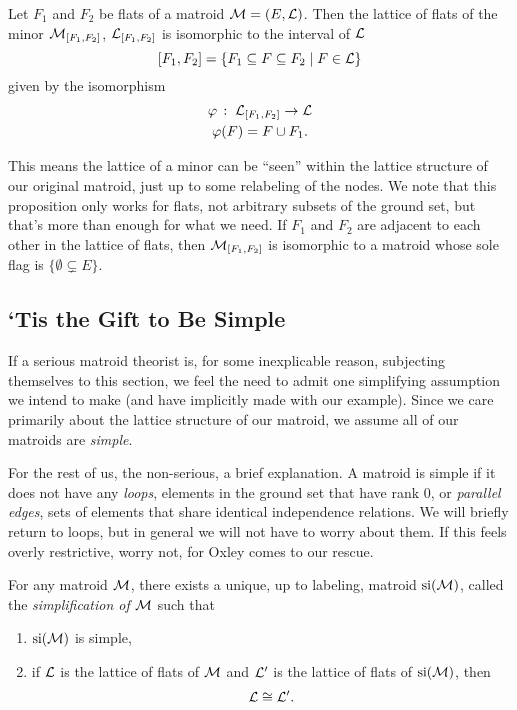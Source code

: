 \documentclass[12pt,oneside]{../../sfsuthesis}
\begin{document}
\begin{proposition}\th\label{thm:minorLattice}
    Let \( F_1 \) and \( F_2 \) be flats of a matroid \( \mathcal{M} = (E, \mathcal{L})\).
    Then the lattice of flats of the minor \( \mathcal{M}_{[F_1, F_2]} \), \( \mathcal{L}_{[F_1, F_2]} \) is isomorphic to the interval of \( \mathcal{L} \)
    \[
        [F_1, F_2] = \{ F_1 \subseteq F \subseteq F_2 \; | \; F \in \mathcal{L} \}
    \]
    given by the isomorphism
    \begin{gather*}
        \varphi\,:\; \mathcal{L}_{[F_1, F_2]} \to \mathcal{L} \\
        \varphi(F) = F \cup F_1.
    \end{gather*}
\end{proposition}

This means the lattice of a minor can be ``seen'' within the lattice structure of our original matroid, just up to some relabeling of the nodes.
We note that this proposition only works for flats, not arbitrary subsets of the ground set, but that's more than enough for what we need.
If \( F_1 \) and \( F_2 \) are adjacent to each other in the lattice of flats, then \( \mathcal{M}_{[F_1, F_2]} \) is isomorphic to a matroid whose sole flag is \( \{ \emptyset \subsetneq E \} \).


\subsection{`Tis the Gift to Be Simple}

If a serious matroid theorist is, for some inexplicable reason, subjecting themselves to this section, we feel the need to admit one simplifying assumption we intend to make (and have implicitly made with our example).
Since we care primarily about the lattice structure of our matroid, we assume all of our matroids are \emph{simple}.

For the rest of us, the non-serious, a brief explanation.
A matroid is simple if it does not have any \emph{loops}, elements in the ground set that have rank 0, or \emph{parallel edges}, sets of elements that share identical independence relations.
We will briefly return to loops, but in general we will not have to worry about them.
If this feels overly restrictive, worry not, for Oxley\cite[p.~49]{oxleyMatroidTheory2011} comes to our rescue.
\begin{proposition}\th\label{thm:simplificationLattice}
    For any matroid \( \mathcal{M} \), there exists a unique, up to labeling, matroid \( \operatorname{si}(\mathcal{M}) \), called the \emph{simplification of \( \mathcal{M} \)}
    such that
    \begin{enumerate}[label=\roman*.]
        \item \( \operatorname{si}(\mathcal{M}) \) is simple,
        \item if \( \mathcal{L} \) is the lattice of flats of \( \mathcal{M} \) and \( \mathcal{L}' \) is the lattice of flats of \( \operatorname{si}(\mathcal{M}) \), then
              \[
                  \mathcal{L} \cong \mathcal{L}'.
              \]
    \end{enumerate}
\end{proposition}
\end{document}
